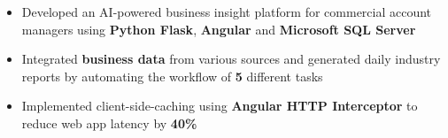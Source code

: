 \documentclass[10pt,a4paper]{altacv}
\begin{document}
\begin{itemize}
  \item Developed an AI-powered business insight platform for commercial account managers using \textbf{Python Flask}, \textbf{Angular} and \textbf{Microsoft SQL Server}
  \item Integrated \textbf{business data} from various sources and generated daily industry reports by automating the workflow of \textbf{5} different tasks
  \item Implemented client-side-caching using \textbf{Angular HTTP Interceptor} to reduce web app latency by \textbf{40\%}

 \end{itemize} 




      \\
      
\divider\smallskip
{}     
 


    
\end{document}
